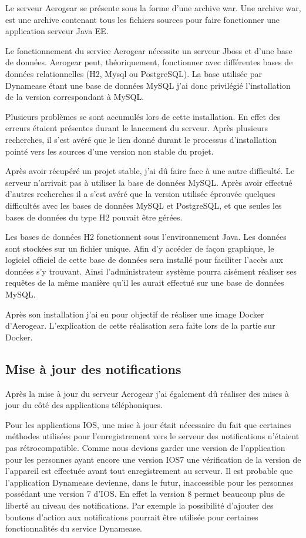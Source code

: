 Le serveur Aerogear se présente sous la forme d'une archive war. Une archive war, est une archive contenant tous les fichiers sources pour faire fonctionner une application serveur Java EE.

Le fonctionnement du service Aerogear nécessite un serveur Jboss et d'une base de données. Aerogear peut, théoriquement, fonctionner avec différentes bases de données relationnelles (H2, Mysql ou PostgreSQL). La base utilisée par Dynamease étant une base de données MySQL j'ai donc privilégié l'installation de la version correspondant à MySQL.

Plusieurs problèmes se sont accumulés lors de cette installation. En effet des erreurs étaient présentes durant le lancement du serveur. Après plusieurs recherches, il s'est avéré que le lien donné durant le processus d'installation pointé vers les sources d'une version non stable du projet. 

Après avoir récupéré un projet stable, j'ai dû faire face à une autre difficulté. Le serveur n'arrivait pas à utiliser la base de données MySQL. Après avoir effectué d'autres recherches il a s'est avéré que la version utilisée éprouvée quelques difficultés avec les bases de données MySQL et PostgreSQL, et que seules les bases de données du type H2 pouvait être gérées.

Les bases de données H2 fonctionnent sous l'environnement Java. Les données sont stockées sur un fichier unique. Afin d'y accéder de façon graphique, le logiciel officiel de cette base de données sera installé pour faciliter l'accès aux données s'y trouvant. Ainsi l'administrateur système pourra aisément réaliser ses requêtes de la même manière qu'il les aurait effectué sur une base de données MySQL.

Après son installation j'ai eu pour objectif de réaliser une image Docker d'Aerogear. L'explication de cette réalisation sera faite lors de la partie sur Docker.

\subsection{Mise à jour des notifications}

Après la mise à jour du serveur Aerogear j'ai également dû réaliser des mises à jour du côté des applications téléphoniques.

Pour les applications IOS, une mise à jour était nécessaire du fait que certaines méthodes utilisées pour l'enregistrement vers le serveur des notifications n'étaient pas rétrocompatible. Comme nous devions garder une version de l'application pour les personnes ayant encore une version IOS7 une vérification de la version de l'appareil est effectuée avant tout enregistrement au serveur. Il est probable que l'application Dynamease devienne, dans le futur, inaccessible pour les personnes possédant une version 7 d'IOS. En effet la version 8 permet beaucoup plus de liberté au niveau des notifications. Par exemple la possibilité d'ajouter des boutons d'action aux notifications pourrait être utilisée pour certaines fonctionnalités du service Dynamease.\\

